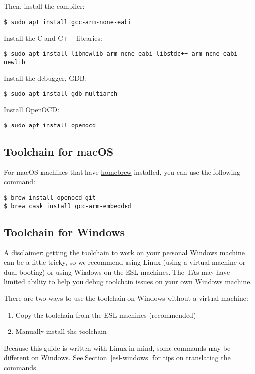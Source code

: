 Then, install the compiler:
%
\begin{verbatim}
$ sudo apt install gcc-arm-none-eabi
\end{verbatim}

Install the C and C++ libraries:
%
\begin{verbatim}
$ sudo apt install libnewlib-arm-none-eabi libstdc++-arm-none-eabi-newlib
\end{verbatim}

Install the debugger, GDB:
%
\begin{verbatim}
$ sudo apt install gdb-multiarch
\end{verbatim}

Install OpenOCD:
%
\begin{verbatim}
$ sudo apt install openocd
\end{verbatim}

\subsection{Toolchain for macOS}

For macOS machines that have \href{https://brew.sh}{homebrew}
installed, you can use the following command:

\begin{verbatim}
$ brew install openocd git
$ brew cask install gcc-arm-embedded
\end{verbatim}

\subsection{Toolchain for Windows}

A disclaimer: getting the toolchain to work on your personal Windows machine
can be a little tricky, so we recommend using Linux (using a virtual machine
or dual-booting) or using Windows on the ESL machines. The TAs may have
limited ability to help you debug toolchain issues on your own Windows
machine.

There are two ways to use the toolchain on Windows without a virtual machine:
\begin{enumerate}
  \item Copy the toolchain from the ESL machines (recommended)
  \item Manually install the toolchain
\end{enumerate}

Because this guide is written with Linux in mind, some commands may be
different on Windows. See Section~\ref{esl-windows} for tips on translating
the commands.


